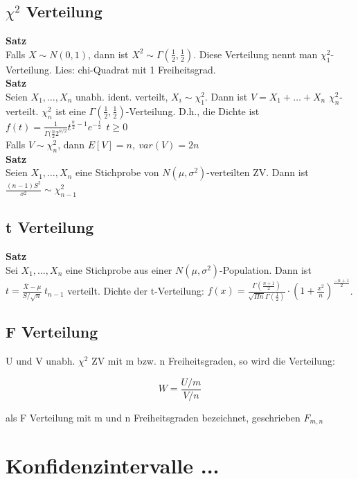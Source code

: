 \documentclass[10pt, a4paper, twocolumn]{scrartcl}
\begin{document}
\subsection{$\chi^2$ Verteilung}

\textbf{Satz}\\
Falls $X\sim N(0,1)$, dann ist $X^2\sim\Gamma(\frac{1}{2},\frac{1}{2})$. Diese Verteilung nennt man $\chi^2_1$-Verteilung. Lies: chi-Quadrat mit 1 Freiheitsgrad.\\

\textbf{Satz}\\
Seien $X_1,\ldots,X_n$ unabh. ident. verteilt, $X_i\sim\chi_1^2$. Dann ist $V=X_1+\ldots+X_n$ $\chi^2_n$-verteilt. $\chi^2_n$ ist eine $\Gamma(\frac{1}{2},\frac{1}{2})$-Verteilung. D.h., die Dichte ist\\
$f(t)=\frac{1}{\Gamma(\frac{n}{2}2^{n/2}}t^{\frac{n}{2}-1}e^{-\frac{t}{2}}\:\:t\geq 0$\\
Falls $V\sim \chi^2_n$, dann $E[V]=n,\:var(V)=2n$\\

\textbf{Satz}\\
Seien $X_1,\ldots,X_n$ eine Stichprobe von $N(\mu,\sigma^2)$-verteilten ZV. Dann ist $\frac{(n-1)S^2}{\sigma^2}\sim\chi^2_{n-1}$

\subsection{t Verteilung}

\textbf{Satz}\\
Sei $X_1,\ldots,X_n$ eine Stichprobe aus einer $N(\mu,\sigma^2)$-Population. Dann ist $t=\frac{\bar{X}-\mu}{S/\sqrt{n}}\:t_{n-1}$ verteilt. Dichte der t-Verteilung: $f(x)=\frac{\Gamma(\frac{n+1}{2})}{\sqrt{\Pi n}\Gamma(\frac{1}{2})}\cdotp(1+\frac{x^2}{n})^{\frac{-n+1}{2}}$.

\subsection{F Verteilung}

U und V unabh. $\chi^2$ ZV mit m bzw. n Freiheitsgraden, so wird die Verteilung:

$$W=\frac{U/m}{V/n}$$

als F Verteilung mit m und n Freiheitsgraden bezeichnet, geschrieben $F_{m,n}$

\section{Konfidenzintervalle ...}
\end{document}
